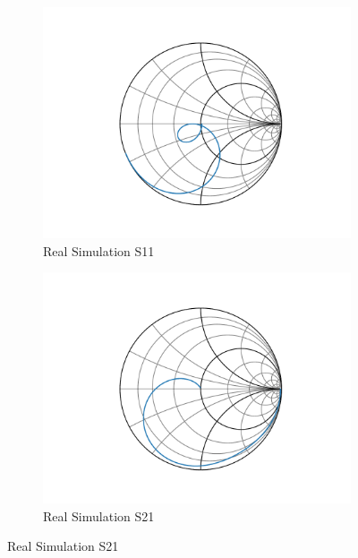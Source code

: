 \documentclass[letterpaper,12pt]{article}
\begin{document}
\begin{figure}[H]
    \begin{subfigure}[t]{.49\textwidth}
      \centering
      \includegraphics[width=\linewidth]{figures/8.s11.real}
      \caption{Real Simulation S11}
    \end{subfigure}
    \hfill
    \begin{subfigure}[t]{.49\textwidth}
      \centering
      \includegraphics[width=\linewidth]{figures/8.s21.real}
      \caption{Real Simulation S21}
    \end{subfigure}
  

\end{figure}
\end{document}
